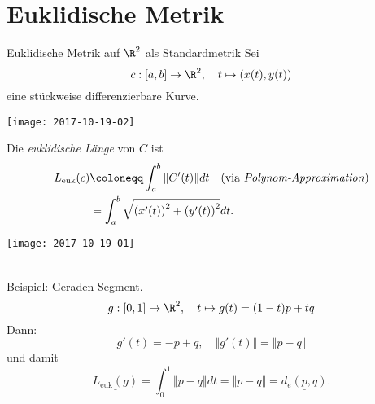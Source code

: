 \section{Euklidische Metrik}
\begin{example}{Euklidische Metrik auf $ \R^2 $ als Standardmetrik}
  Sei
  \begin{equation*}
    c : [a,b] \to \R^2, \quad t \mapsto (x(t), y(t))
  \end{equation*}
  eine stückweise differenzierbare Kurve. \\
  \begin{marginfigure}
    \texttt{[image: 2017-10-19-02]}
    \caption{$ c $ bildet ein Intervall $ [a,b] \subseteq \R $ auf eine Kurve im $ \R^2 $ ab.}
  \end{marginfigure}
  Die \emph{euklidische Länge} von $ C $ ist
  \begin{align*}
    L_{\text{euk}}(c) &\coloneqq \int_a^b \Vert C'(t) \Vert dt \quad \text{(via \emph{Polynom-Approximation})} \\
     &= \int_a^b \sqrt{\left( x'(t) \right)^2 + \left( y'(t) \right)^2}dt\text{.}
  \end{align*}
  \begin{marginfigure}
    \texttt{[image: 2017-10-19-01]}
    \caption{Durch \emph{Polynom-Approximation} wird eine Kurve sukzessive angenähert.}
  \end{marginfigure}
   \ \\
  \underline{Beispiel}: Geraden-Segment.
  \begin{equation*}
    g: [0,1] \to \R^2, \quad t \mapsto g(t) = (1-t)p + tq
  \end{equation*}
  Dann:
  \begin{equation*}
    g'(t) = -p+q, \quad \Vert g'(t) \Vert = \Vert p - q \Vert
  \end{equation*}
  und damit
  \begin{equation*}
    \underline{L_{\text{euk}}(g)} = \int_0^1\Vert p - q \Vert dt = \Vert p - q \Vert = \underline{d_e(p,q)}\text{.}
  \end{equation*}
\end{example}

